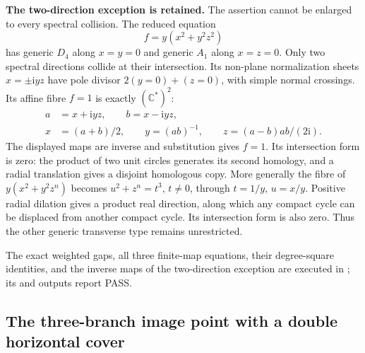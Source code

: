 \par\medskip\noindent\textbf{The two-direction exception is retained.}
The assertion cannot be enlarged to every spectral
collision. The reduced equation
\[
                       f=y(x^2+y^2z^2)
\]
has generic $D_4$ along $x=y=0$ and generic $A_1$
along $x=z=0$. Only two spectral directions collide
at their intersection. Its non-plane normalization
sheets $x=\pm\mathrm i yz$ have pole divisor
$2(y=0)+(z=0)$, with simple normal crossings.
Its affine fibre $f=1$ is exactly $(\mathbb C^*)^2$:
\[
 \begin{split}
       a&=x+\mathrm i yz,\qquad b=x-\mathrm i yz,\\
       x&=(a+b)/2,\qquad y=(ab)^{-1},\qquad
       z=(a-b)ab/(2\mathrm i).
 \end{split}
\]
The displayed maps are inverse and substitution gives
$f=1$. Its intersection form is zero: the product
of two unit circles generates its second homology,
and a radial translation gives a disjoint homologous
copy. More generally the fibre of $y(x^2+y^2z^n)$
becomes $u^2+z^n=t^3$, $t\ne0$, through
$t=1/y$, $u=x/y$. Positive radial dilation gives
a product real direction, along which any compact
cycle can be displaced from another compact cycle.
Its intersection form is also zero. Thus the
other generic transverse type remains unrestricted.

The exact weighted gaps, all three finite-map
equations, their degree-square identities, and the
inverse maps of the two-direction exception are
executed in ;
its  and  outputs report PASS.


\subsection{The three-branch image point with a double horizontal cover}

